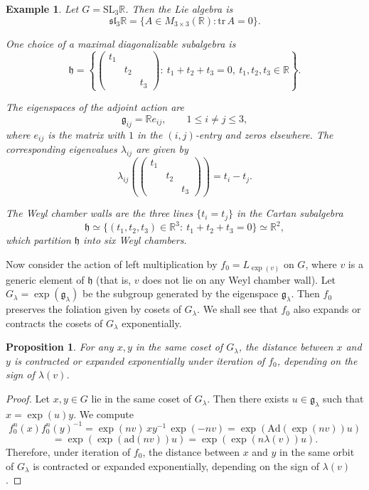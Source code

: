 \documentclass[11pt]{amsart}
\numberwithin{equation}{section}
\newcommand{\R}{\mathbb{R}}
\theoremstyle{plain}
\newtheorem{prop}[thm]{Proposition}
\newtheorem{exm}{Example}[section]
\begin{document}
\begin{exm}
Let $G=\mathrm{SL}_3\R$. Then the Lie algebra is
\[
\mathfrak{sl}_3\R=\{A\in M_{3\times 3}(\R): \mathrm{tr}\,A=0\}.
\]

One choice of a maximal diagonalizable subalgebra is
\[
\mathfrak{h}=\left\{
\begin{pmatrix}
 t_1 & &\\
 & t_2&\\
 && t_3
\end{pmatrix}:\ t_1+t_2+t_3=0,\ t_1,t_2,t_3\in \R
\right\}.
\]

The eigenspaces of the adjoint action are
\[
\mathfrak{g}_{ij}=\R e_{ij},\qquad 1\le i\neq j\le 3,
\]
where $e_{ij}$ is the matrix with $1$ in the $(i,j)$-entry and zeros elsewhere. The corresponding eigenvalues $\lambda_{ij}$ are given by
\[
\lambda_{ij}\!\left(
\begin{pmatrix}
 t_1 & &\\
 & t_2&\\
 && t_3
\end{pmatrix}
\right)=t_i-t_j.
\]

The Weyl chamber walls are the three lines $\{t_i=t_j\}$ in the Cartan subalgebra
\[
\mathfrak{h}\simeq \{(t_1,t_2,t_3)\in \R^3:\ t_1+t_2+t_3=0\}\simeq \R^2,
\]
which partition $\mathfrak{h}$ into six Weyl chambers.
\end{exm}

Now consider the action of left multiplication by $f_0=L_{\exp(v)}$ on $G$, where $v$ is a generic element of $\mathfrak{h}$ (that is, $v$ does not lie on any Weyl chamber wall). Let $G_\lambda=\exp(\mathfrak{g}_\lambda)$ be the subgroup generated by the eigenspace $\mathfrak{g}_\lambda$. Then $f_0$ preserves the foliation given by cosets of $G_\lambda$. We shall see that $f_0$ also expands or contracts the cosets of $G_\lambda$ exponentially.

\begin{prop}
For any $x,y$ in the same coset of $G_\lambda$, the distance between $x$ and $y$ is contracted or expanded exponentially under iteration of $f_0$, depending on the sign of $\lambda(v)$.
\end{prop}

\begin{proof}
Let $x,y\in G$ lie in the same coset of $G_\lambda$. Then there exists $u\in \mathfrak{g}_\lambda$ such that $x=\exp(u)y$. We compute
$$
f_0^n(x)f_0^n(y)^{-1}
=\exp(nv)\, x y^{-1}\, \exp(-nv)
=\exp(\mathrm{Ad}(\exp(nv))u)
$$$$=\exp(\exp(\mathrm{ad}(nv))u)
=\exp(\exp(n\lambda(v))u).
$$
Therefore, under iteration of $f_0$, the distance between $x$ and $y$ in the same orbit of $G_\lambda$ is contracted or expanded exponentially, depending on the sign of $\lambda(v)$.
\end{proof}
\end{document}
